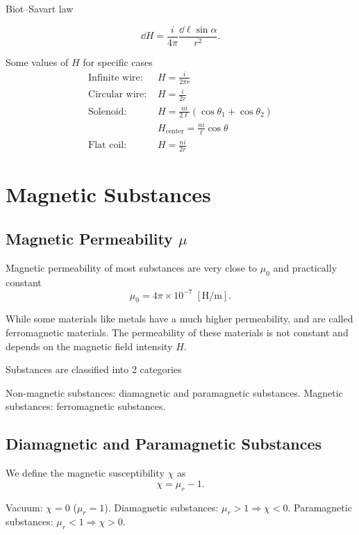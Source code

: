 \documentclass{report}
\begin{document}
Biot–Savart law

\[
	\dd{H} = \frac{i}{4\pi} \frac{\dd{\ell}\sin \alpha}{r^2}
	.\]

Some values of $H$ for specific cases
\begin{align*}
	\text{Infinite wire: } & H = \frac{i}{2\pi r}                                 \\
	\text{Circular wire: } & H = \frac{i}{2 r}                                    \\
	\text{Solenoid: }      & H = \frac{ni}{2\ell} (\cos \theta_1 + \cos \theta_2) \\
	                       & H_\text{center} = \frac{ni}{\ell} \cos \theta        \\
	\text{Flat coil: }     & H = \frac{ni}{2r}
\end{align*}

\section{Magnetic Substances}

\subsection{Magnetic Permeability $\mu$}

Magnetic permeability of most substances are very close to $\mu_0$ and practically constant
\[
	\mu_0 = 4\pi\times 10^{-7} \; [\unit{\henry\per\metre}]
	.\]

While some materials like metals have a much higher permeability, and are called ferromagnetic materials. The permeability of these materials is not constant and depends on the magnetic field intensity $H$.

Substances are classified into 2 categories
\begin{enumerate}
	\ii Non-magnetic substances: diamagnetic and paramagnetic substances.
	\ii Magnetic substances: ferromagnetic substances.
\end{enumerate}

\subsection{Diamagnetic and Paramagnetic Substances}

We define the magnetic susceptibility $\chi$ as
\[
	\chi = \mu_r -1
	.\]

\begin{itemize}
	\ii Vacuum: $\chi = 0$ ($\mu_r=1$).
	\ii Diamagnetic substances: $\mu_r>1\Rightarrow\chi < 0$.
	\ii Paramagnetic substances: $\mu_r<1\Rightarrow\chi > 0$.
\end{itemize}
\end{document}
